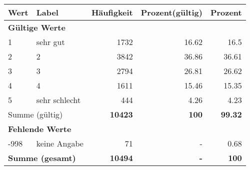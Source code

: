      \begin{longtable}{lXrrr}
     \toprule
     \textbf{Wert} & \textbf{Label} & \textbf{Häufigkeit} & \textbf{Prozent(gültig)} & \textbf{Prozent} \\
     \endhead
     \midrule
     \multicolumn{5}{l}{\textbf{Gültige Werte}}\\

     1 &
     \multicolumn{1}{X}{ sehr gut   } &


       \num{1732} &
       \num[round-mode=places,round-precision=2]{16.62} &
         \num[round-mode=places,round-precision=2]{16.5} \\

     2 &
     \multicolumn{1}{X}{ 2   } &


       \num{3842} &
       \num[round-mode=places,round-precision=2]{36.86} &
         \num[round-mode=places,round-precision=2]{36.61} \\

     3 &
     \multicolumn{1}{X}{ 3   } &


       \num{2794} &
       \num[round-mode=places,round-precision=2]{26.81} &
         \num[round-mode=places,round-precision=2]{26.62} \\

     4 &
     \multicolumn{1}{X}{ 4   } &


       \num{1611} &
       \num[round-mode=places,round-precision=2]{15.46} &
         \num[round-mode=places,round-precision=2]{15.35} \\

     5 &
     \multicolumn{1}{X}{ sehr schlecht   } &


       \num{444} &
       \num[round-mode=places,round-precision=2]{4.26} &
         \num[round-mode=places,round-precision=2]{4.23} \\
     \midrule
     \multicolumn{2}{l}{Summe (gültig)} &
       \textbf{\num{10423}} &
     \textbf{\num{100}} &
       \textbf{\num[round-mode=places,round-precision=2]{99.32}} \\
     \multicolumn{5}{l}{\textbf{Fehlende Werte}}\\
       -998 &
       keine Angabe &
         \num{71} &
        - &
         \num[round-mode=places,round-precision=2]{0.68} \\
     \midrule
     \multicolumn{2}{l}{\textbf{Summe (gesamt)}} &
          \textbf{\num{10494}} &
        \textbf{-} &
        \textbf{\num{100}} \\
     \bottomrule
     \end{longtable}
     

